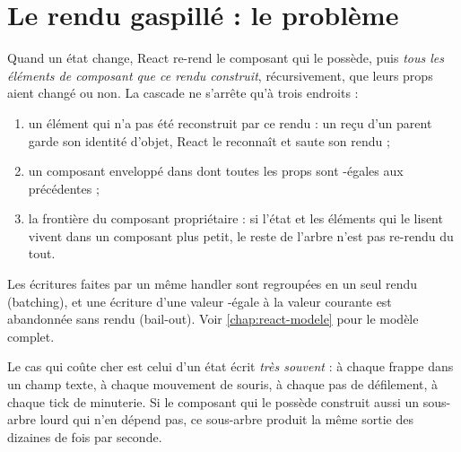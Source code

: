 \section{Le rendu gaspillé : le problème}
\label{sec:regles-rendu-rsc-cascade}

\begin{react}
Quand un état change, React re-rend le composant qui le possède, puis \emph{tous les éléments de
composant que ce rendu construit}, récursivement, que leurs props aient changé ou non. La
cascade ne s'arrête qu'à trois endroits :
\begin{enumerate}
  \item un élément qui n'a pas été reconstruit par ce rendu : un  reçu d'un parent
        garde son identité d'objet, React le reconnaît et saute son rendu ;
  \item un composant enveloppé dans  dont toutes les props sont
        -égales aux précédentes ;
  \item la frontière du composant propriétaire : si l'état et les éléments qui le lisent vivent
        dans un composant plus petit, le reste de l'arbre n'est pas re-rendu du tout.
\end{enumerate}
Les écritures faites par un même handler sont regroupées en un seul rendu (batching), et une
écriture d'une valeur -égale à la valeur courante est abandonnée sans rendu
(bail-out). Voir \cref{chap:react-modele} pour le modèle complet.
\end{react}

Le cas qui coûte cher est celui d'un état écrit \emph{très souvent} : à chaque frappe dans un
champ texte, à chaque mouvement de souris, à chaque pas de défilement, à chaque tick de minuterie.
Si le composant qui le possède construit aussi un sous-arbre lourd qui n'en dépend pas, ce
sous-arbre produit la même sortie des dizaines de fois par seconde.

